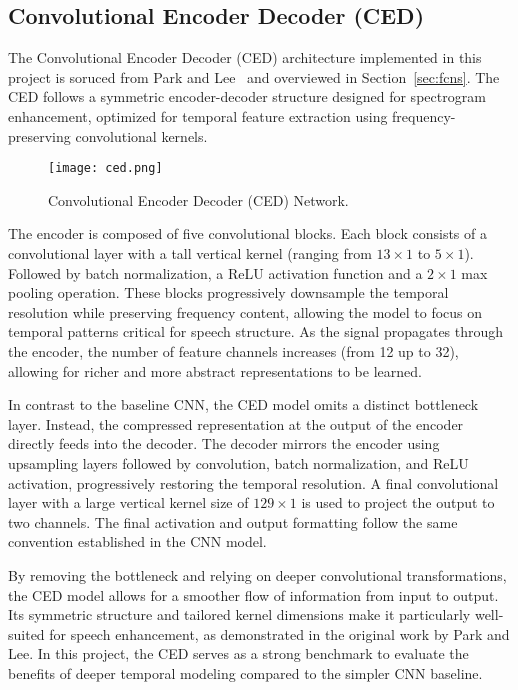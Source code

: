 \subsection{Convolutional Encoder Decoder (CED)}
\label{sec:ced}

The Convolutional Encoder Decoder (CED) architecture implemented in this project is soruced from Park and Lee~\cite{park2017acoustic} and overviewed in Section~\ref{sec:fcns}. The CED follows a symmetric encoder-decoder structure designed for spectrogram enhancement, optimized for temporal feature extraction using frequency-preserving convolutional kernels.

\begin{figure}[h]
    \centering
    \texttt{[image: ced.png]}
    \caption{\label{fig:ced}Convolutional Encoder Decoder (CED) Network\cite{park2017acoustic}.}
\end{figure}

The encoder is composed of five convolutional blocks. Each block consists of a convolutional layer with a tall vertical kernel (ranging from \(13 \times 1\) to \(5 \times 1\)). Followed by batch normalization, a ReLU activation function and a \(2 \times 1\) max pooling operation. These blocks progressively downsample the temporal resolution while preserving frequency content, allowing the model to focus on temporal patterns critical for speech structure. As the signal propagates through the encoder, the number of feature channels increases (from 12 up to 32), allowing for richer and more abstract representations to be learned.

In contrast to the baseline CNN, the CED model omits a distinct bottleneck layer. Instead, the compressed representation at the output of the encoder directly feeds into the decoder. The decoder mirrors the encoder using upsampling layers followed by convolution, batch normalization, and ReLU activation, progressively restoring the temporal resolution. A final convolutional layer with a large vertical kernel size of \(129 \times 1\) is used to project the output to two channels. The final activation and output formatting follow the same convention established in the CNN model.

By removing the bottleneck and relying on deeper convolutional transformations, the CED model allows for a smoother flow of information from input to output. Its symmetric structure and tailored kernel dimensions make it particularly well-suited for speech enhancement, as demonstrated in the original work by Park and Lee. In this project, the CED serves as a strong benchmark to evaluate the benefits of deeper temporal modeling compared to the simpler CNN baseline.


